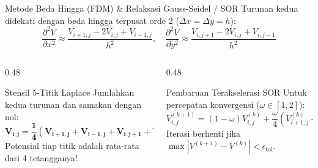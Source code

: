 \documentclass[aspectratio=169,10pt]{beamer}
\begin{document}
\begin{frame}{Metode Beda Hingga (FDM) \& Relaksasi Gauss-Seidel / SOR}
  Turunan kedua didekati dengan beda hingga terpusat orde 2 ($\Delta x = \Delta y = h$):
  \begin{equation*}
    \frac{\partial^2 V}{\partial x^2} \approx \frac{V_{i+1,j} - 2V_{i,j} + V_{i-1,j}}{h^2}, \quad \frac{\partial^2 V}{\partial y^2} \approx \frac{V_{i,j+1} - 2V_{i,j} + V_{i,j-1}}{h^2}
  \end{equation*}
  \begin{columns}[t]
    \begin{column}{0.48\textwidth}
      \begin{block}{Stensil 5-Titik Laplace}
        \small
        Jumlahkan kedua turunan dan samakan dengan nol:
        \begin{equation*}
          \mathbf{V_{i,j} = \frac{1}{4}\left( V_{i+1,j} + V_{i-1,j} + V_{i,j+1} + V_{i,j-1} \right)}
        \end{equation*}
        Potensial tiap titik adalah rata-rata dari 4 tetangganya!
      \end{block}
    \end{column}
    \begin{column}{0.48\textwidth}
      \begin{alertblock}{Pembaruan Terakselerasi SOR}
        \small
        Untuk percepatan konvergensi ($\omega \in [1, 2]$):
        \begin{equation*}
          V_{i,j}^{(k+1)} = (1-\omega)V_{i,j}^{(k)} + \frac{\omega}{4}\left( V_{i+1,j}^{(k)} + V_{i-1,j}^{(k+1)} + \dots \right)
        \end{equation*}
        Iterasi berhenti jika $\max |V^{(k+1)} - V^{(k)}| < \epsilon_{\text{tol}}$.
      \end{alertblock}
    \end{column}
  \end{columns}
\end{frame}
\end{document}
